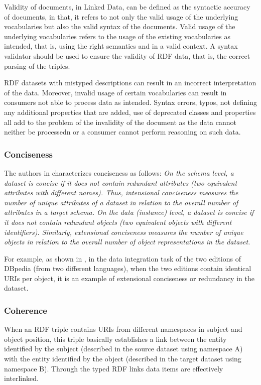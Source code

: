 \begin{definition}
Validity of documents, in Linked Data, can be defined as the syntactic accuracy of documents, in that, it refers to not only the valid usage of the underlying vocabularies but also the valid syntax of the documents. 
Valid usage of the underlying vocabularies refers to the usage of the existing vocabularies as intended, that is, using the right semantics and in a valid context.
A syntax validator should be used to ensure the validity of RDF data, that is, the correct parsing of the triples. 
\end{definition}

RDF datasets with mistyped descriptions can result in an incorrect interpretation of the data.
Moreover, invalid usage of certain vocabularies can result in consumers not able to process data as intended.
Syntax errors, typos, not defining any additional properties that are added, use of deprecated classes and properties all add to the problem of the invalidity of the document as the data cannot neither be processedn or a consumer cannot perform reasoning on such data. 

\subsubsection{Conciseness}
 The authors in \cite{Mendes} characterizes conciseness as follows: \emph{On the schema level, a dataset is concise if it does not contain redundant attributes (two equivalent attributes with different names). 
Thus, intensional conciseness measures the number of unique attributes of a dataset in relation to the overall number of attributes in a target schema.
On the data (instance) level, a dataset is concise if it does not contain redundant objects (two equivalent objects with different identifiers). 
Similarly, extensional conciseness measures the number of unique objects in relation to the overall number of object representations in the dataset.}

For example, as shown in \cite{Mendes}, in the data integration task of the two editions of DBpedia (from two different languages), when the two editions contain identical URIs per object, it is an example of extensional conciseness or redundancy in the dataset.

\subsubsection{Coherence}
When an RDF triple contains URIs from different namespaces in subject and object position, this triple basically establishes a link between the entity identified by the subject (described in the source dataset using namespace A) with the entity identified by the object (described in the target dataset using namespace B). 
Through the typed RDF links data items are effectively interlinked.

